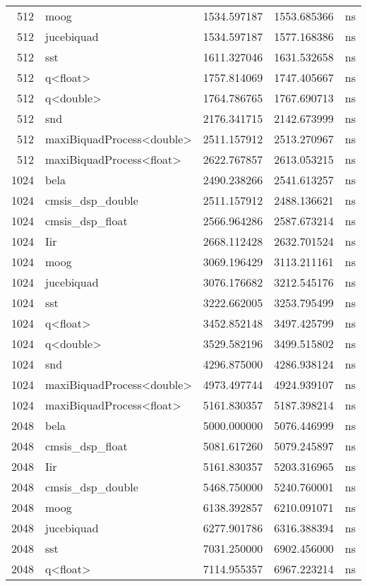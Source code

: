 \begin{tabular}{rlrrl}
512 & moog & 1534.597187 & 1553.685366 & ns \\
512 & jucebiquad & 1534.597187 & 1577.168386 & ns \\
512 & sst & 1611.327046 & 1631.532658 & ns \\
512 & q<float> & 1757.814069 & 1747.405667 & ns \\
512 & q<double> & 1764.786765 & 1767.690713 & ns \\
512 & snd & 2176.341715 & 2142.673999 & ns \\
512 & maxiBiquadProcess<double> & 2511.157912 & 2513.270967 & ns \\
512 & maxiBiquadProcess<float> & 2622.767857 & 2613.053215 & ns \\
1024 & bela & 2490.238266 & 2541.613257 & ns \\
1024 & cmsis\_dsp\_double & 2511.157912 & 2488.136621 & ns \\
1024 & cmsis\_dsp\_float & 2566.964286 & 2587.673214 & ns \\
1024 & Iir & 2668.112428 & 2632.701524 & ns \\
1024 & moog & 3069.196429 & 3113.211161 & ns \\
1024 & jucebiquad & 3076.176682 & 3212.545176 & ns \\
1024 & sst & 3222.662005 & 3253.795499 & ns \\
1024 & q<float> & 3452.852148 & 3497.425799 & ns \\
1024 & q<double> & 3529.582196 & 3499.515802 & ns \\
1024 & snd & 4296.875000 & 4286.938124 & ns \\
1024 & maxiBiquadProcess<double> & 4973.497744 & 4924.939107 & ns \\
1024 & maxiBiquadProcess<float> & 5161.830357 & 5187.398214 & ns \\
2048 & bela & 5000.000000 & 5076.446999 & ns \\
2048 & cmsis\_dsp\_float & 5081.617260 & 5079.245897 & ns \\
2048 & Iir & 5161.830357 & 5203.316965 & ns \\
2048 & cmsis\_dsp\_double & 5468.750000 & 5240.760001 & ns \\
2048 & moog & 6138.392857 & 6210.091071 & ns \\
2048 & jucebiquad & 6277.901786 & 6316.388394 & ns \\
2048 & sst & 7031.250000 & 6902.456000 & ns \\
2048 & q<float> & 7114.955357 & 6967.223214 & ns \\

\end{tabular}
